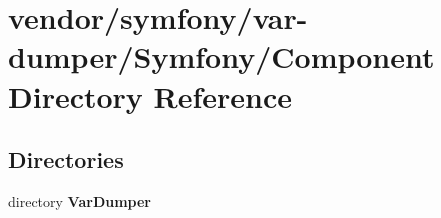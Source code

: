\section{vendor/symfony/var-\/dumper/\+Symfony/\+Component Directory Reference}
\label{dir_95b6dc5b81b78e88f7b99796e6a7b945}
\subsection*{Directories}
\begin{DoxyCompactItemize}
\item 
directory {\bf Var\+Dumper}
\end{DoxyCompactItemize}
